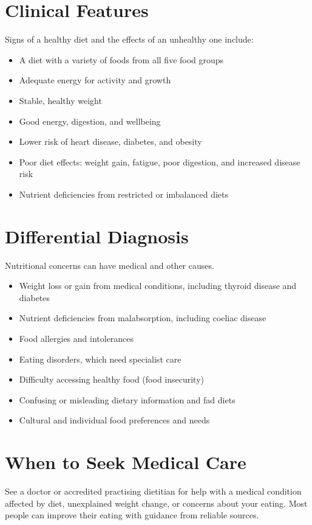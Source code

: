 \section*{Clinical Features}
Signs of a healthy diet and the effects of an unhealthy one include:

\begin{itemize}
    \item A diet with a variety of foods from all five food groups
    \item Adequate energy for activity and growth
    \item Stable, healthy weight
    \item Good energy, digestion, and wellbeing
    \item Lower risk of heart disease, diabetes, and obesity
    \item Poor diet effects: weight gain, fatigue, poor digestion, and increased disease risk
    \item Nutrient deficiencies from restricted or imbalanced diets
\end{itemize}

\section*{Differential Diagnosis}
Nutritional concerns can have medical and other causes.

\begin{itemize}
    \item Weight loss or gain from medical conditions, including thyroid disease and diabetes
    \item Nutrient deficiencies from malabsorption, including coeliac disease
    \item Food allergies and intolerances
    \item Eating disorders, which need specialist care
    \item Difficulty accessing healthy food (food insecurity)
    \item Confusing or misleading dietary information and fad diets
    \item Cultural and individual food preferences and needs
\end{itemize}

\section*{When to Seek Medical Care}
See a doctor or accredited practising dietitian for help with a medical condition affected by diet, unexplained weight change, or concerns about your eating. Most people can improve their eating with guidance from reliable sources.

